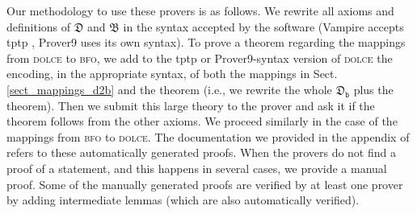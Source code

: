 \documentclass[ao]{iosart2x}
\newcommand{\nb}[1]{\textcolor{red}{$|$}\marginpar{\hspace*{-0cm}\parbox{20mm}{\scriptsize\raggedright\textcolor{red}{#1}}}}
\newcommand{\dolce}{{\textsc{dolce}}}
\newcommand{\bfo}{{\textsc{bfo}}}
\newcommand {\thdolce} {\ensuremath{\mathfrak{D}}}
\newcommand {\thbfo} {\ensuremath{\mathfrak{B}}}
\newcommand {\thdolcedbmap} {\ensuremath{\mathfrak{D}_\texttt{b}}}
\begin{document}

Our methodology to use these provers is as follows. We rewrite all axioms and definitions of {$\thdolce$} and $\thbfo$ in the syntax accepted by the software (Vampire accepts tptp \citep{Sut16}, Prover9 uses its own syntax).
To prove a theorem regarding the mappings from {\dolce} to {\bfo}, we add to the tptp or Prover9-syntax version of {\dolce} the encoding, in the appropriate syntax, of both the mappings in Sect.\ref{sect_mappings_d2b} and the theorem (i.e., we rewrite the whole $\thdolcedbmap$ plus the theorem). 
Then we submit this large theory to the prover and ask it if the theorem follows from the other axioms. 
We proceed similarly in the case of the mappings from {\bfo} to {\dolce}. The documentation we provided in the appendix of \citep{D24} %
refers to these automatically generated proofs.
When the provers do not find a proof of a statement, and this happens in several cases, we provide a manual proof. Some of the manually generated proofs are verified by at least one prover by adding intermediate lemmas (which are also automatically verified). %
\end{document}
